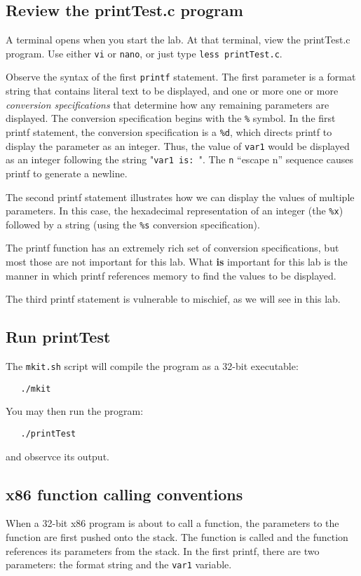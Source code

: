 \subsection{Review the printTest.c program}
A terminal opens when you start the lab.  At that terminal, view the printTest.c program.  Use either {\tt vi} or {\tt nano}, or just type {\tt less printTest.c}.

Observe the syntax of the first {\tt printf} statement.  The first parameter
is a format string that contains literal text to be displayed, and one or more
one or more \textit{conversion specifications} that determine how any remaining
parameters are displayed.  The conversion specification begins with the {\tt \%} symbol.  In the first printf statement, the conversion specification is
a {\tt \%d}, which directs printf to display the parameter as an integer.
Thus, the value of {\tt var1} would be displayed as an integer following the string "{\tt var1 is: }".  The {\tt {}n} ``escape n'' sequence causes printf to
generate a newline.

The second printf statement illustrates how we can display the values of
multiple parameters.  In this case, the hexadecimal representation of an integer (the {\tt \%x}) followed by a string (using the 
{\tt \%s} conversion specification).

The printf function has an extremely rich set  of conversion specifications, but most those are not important for this lab.  What \textbf{is} important for this lab is the manner in which printf references memory to find the values to be displayed.

The third printf statement is vulnerable to mischief, as we will see 
in this lab.

\subsection{Run printTest}
The {\tt mkit.sh} script will compile the program as a 32-bit executable:
\begin{verbatim}
   ./mkit
\end{verbatim}
\noindent You may then run the program:
\begin{verbatim}
   ./printTest
\end{verbatim}
\noindent and observce its output.
\subsection{x86 function calling conventions}
When a 32-bit x86 program is about to call a function, the parameters to the
function are first pushed onto the stack.  The function is called and
the function references its parameters from the stack.  In the first printf, there
are two parameters: the format string and the {\tt var1} variable. 


